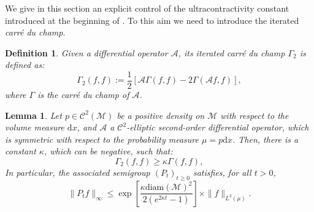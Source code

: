 \documentclass[10pt,a4paper]{article}
\newcommand\cA{\mathcal{A}}
\newcommand\cC{\mathcal{C}}
\newcommand\cM{\mathcal{M}}
\newcommand\dd{\mathrm{d}}
\newcommand{\PAR}[1]{{{\left(#1\right)}}} %
\newcommand{\SBRA}[1]{{{\left[#1\right]}}} %
\newtheorem{definition}[theorem]{Definition}
\newtheorem{lemma}[theorem]{Lemma}
\begin{document}
We give in this section an explicit control of the ultracontractivity constant introduced at the beginning of .
To this aim we need to introduce the iterated \textit{carré du champ}.
\begin{definition} Given a differential operator $\mathcal{A}$, its iterated \textit{carré du champ} $\Gamma_2$ is defined as: 
    $$\Gamma_2(f,f) := \frac{1}{2}\SBRA{ \mathcal{A}\Gamma(f,f)-2\Gamma(\cA f,f)},$$
    where $\Gamma$ is the \textit{carré du champ} of $\cA$.
\end{definition}
\begin{lemma}\label{lemma: ultracontractivity2}
Let $p \in \cC^2(\cM)$ be a positive density on $\cM$ with respect to the volume measure $\dd x$, and $\cA$ a $\mathcal{C}^2$-elliptic second-order differential operator, which is symmetric with respect to the probability measure $\mu =p \mathrm{d}x$.
Then, there is a constant $\kappa$, which can be negative, such that: 
\begin{equation}
    \Gamma_2(f,f) \ge \kappa \Gamma(f,f),
    \label{eq: curvature-dimension condition estimation}
\end{equation}
In particular, the associated semigroup $\PAR{P_t}_{t\ge 0}$ satisfies,  for all $t>0$, 
\begin{equation}
\label{eq:constante_ct2}
\| P_tf\|_{\infty} \le \exp\SBRA{ \frac{\kappa \mathrm{diam}(\cM)^2}{2(e^{2\kappa t}-1)}} \times \|f\|_{L^2(\mu)}.
\end{equation}
\end{lemma}
\end{document}
